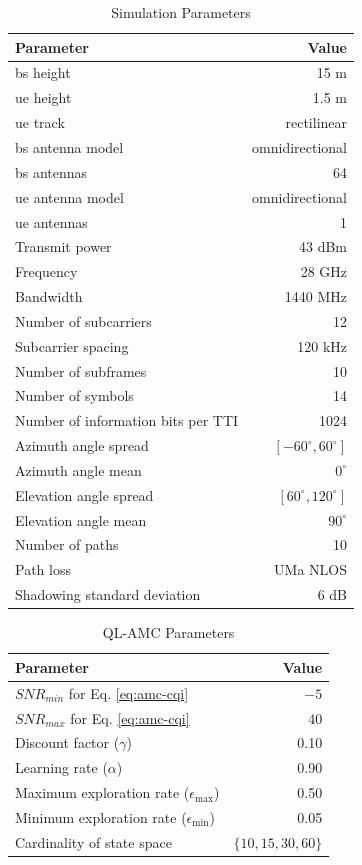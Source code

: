 \begin{table}[t]
\centering
\caption{Simulation Parameters}
\label{tab:amc-sim-params}
\begin{tabularx}{0.8\columnwidth}{X r}
\toprule
\textbf{Parameter} 	& \textbf{Value} \\
\midrule
\gls{bs} height & 15 m\\
\gls{ue} height & 1.5 m\\
\gls{ue} track & rectilinear\\
\gls{bs}  antenna model & omnidirectional \\
\gls{bs}  antennas & 64 \\
\gls{ue} antenna model & omnidirectional \\
\gls{ue} antennas & 1 \\
Transmit power & 43 dBm\\
Frequency & 28 GHz\\
Bandwidth & 1440 MHz\\
Number of subcarriers  & 12\\
Subcarrier spacing & 120 kHz\\
Number of subframes & 10\\
Number of symbols & 14\\
Number of information bits per TTI & 1024\\
Azimuth angle spread & $[-60^{\circ}, 60^{\circ}]$\\
Azimuth angle mean & $0^{\circ}$\\
Elevation angle spread & $[60^{\circ}, 120^{\circ}]$\\
Elevation angle mean & $90^{\circ}$\\

Number of paths & 10\\
Path loss & UMa NLOS\\
Shadowing standard deviation & 6 dB\\
\bottomrule
\end{tabularx}
\end{table}
%


\begin{table}[tb]
	\centering
	\caption{QL-AMC Parameters}
	\label{tab:amc-rl-params}
	\begin{tabularx}{0.8\columnwidth}{l r}
		\toprule
		\textbf{Parameter} 	   & \textbf{Value} \\
    \midrule
    $SNR_{min}$ for Eq. \eqref{eq:amc-cqi} & $-5$ \\
    $SNR_{max}$ for Eq. \eqref{eq:amc-cqi} & $40$ \\
		Discount factor ($\gamma$) & 0.10\\
		Learning rate ($\alpha$) & 0.90\\
		Maximum exploration rate ($\epsilon_{\max}$) & 0.50\\
    Minimum exploration rate ($\epsilon_{\min}$) & 0.05\\
    Cardinality of state space & $\{10,15,30,60 \}$\\
		\bottomrule
	\end{tabularx}
\end{table}


